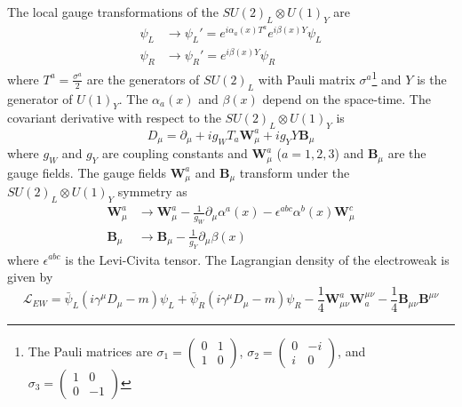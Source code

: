 The local gauge transformations of the $SU(2)_{L} \otimes U(1)_{Y}$ are
%
\begin{align}
\psi_{L} & \rightarrow \psi_{L}' = e^{i \alpha_{a}(x) T^{a}}e^{i \beta(x) Y} \psi_{L}\\
\psi_{R} & \rightarrow \psi_{R}' = e^{i \beta(x) Y} \psi_{R}
\label{eq:sm_local_gauge_transformations_ew_1}
\end{align}
%
where $T^{a} = \frac{\sigma^{a}}{2}$ are the generators of $SU(2)_{L}$ with Pauli matrix $\sigma^{a}$\footnote{The Pauli matrices are $\sigma_{1}=\left(\begin{matrix}0 & 1\\1 & 0\end{matrix}\right)$, $\sigma_{2}=\left(\begin{matrix}0 & -i\\i & 0\end{matrix}\right)$, and $\sigma_{3}=\left(\begin{matrix}1 & 0\\0 & -1\end{matrix}\right)$} and $Y$ is the generator of $U(1)_{Y}$.
The $\alpha_{a}(x)$ and $\beta(x)$ depend on the space-time.
The covariant derivative with respect to the $SU(2)_{L} \otimes U(1)_{Y}$ is
%
\begin{equation}
D_{\mu} = \partial_{\mu} + i g_{W} T_{a} \bm{W}_{\mu}^{a} + i g_{Y} Y \bm{B}_{\mu}
\label{eq:sm_derivative_ew}
\end{equation}
%
where $g_{W}$ and $g_{Y}$ are coupling constants and $\bm{W}_{\mu}^{a}$ ($a = 1, 2, 3$) and $\bm{B}_{\mu}$ are the gauge fields.
The gauge fields $\bm{W}_{\mu}^{a}$ and $\bm{B}_{\mu}$ transform under the $SU(2)_{L} \otimes U(1)_{Y}$ symmetry as
%
\begin{align}
\bm{W}_{\mu}^{a} & \rightarrow \bm{W}_{\mu}^{a} - \frac{1}{g_{W}} \partial_{\mu} \alpha^{a}(x) - \epsilon^{abc} \alpha^{b}(x) \bm{W}_{\mu}^{c}\\
\bm{B}_{\mu} & \rightarrow \bm{B}_{\mu} - \frac{1}{g_{Y}} \partial_{\mu} \beta(x)
\label{eq:sm_local_gauge_transformations_ew_2}
\end{align}
%
where $\epsilon^{abc}$ is the Levi-Civita tensor.
The Lagrangian density of the electroweak is given by
%
\begin{equation}
\mathcal{L}_{EW} = \bar{\psi}_{L} (i \gamma^{\mu} D_{\mu} - m) \psi_{L} + \bar{\psi}_{R} (i \gamma^{\mu} D_{\mu} - m) \psi_{R} - \frac{1}{4} \bm{W}_{\mu\nu}^{a} \bm{W}_{a}^{\mu\nu} - \frac{1}{4} \bm{B}_{\mu\nu} \bm{B}^{\mu\nu}
\label{eq:sm_Lagrangian_ew}
\end{equation}
